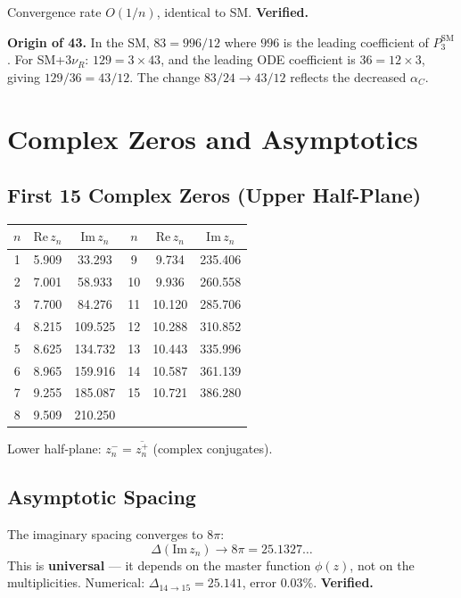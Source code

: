 \documentclass[11pt,a4paper]{article}
\newcommand{\proven}[1]{\textcolor{verified}{\textbf{#1}}}
\begin{document}
Convergence rate $O(1/n)$, identical to SM. \proven{Verified.}

\medskip\noindent
\textbf{Origin of 43.}
In the SM, $83 = 996/12$ where $996$ is the leading coefficient of $P_3^{\mathrm{SM}}$.
For SM+$3\nu_R$: $129 = 3 \times 43$, and the leading ODE coefficient is $36 = 12 \times 3$,
giving $129/36 = 43/12$.
The change $83/24 \to 43/12$ reflects the decreased $\alpha_C$.


\section{Complex Zeros and Asymptotics}

\subsection{First 15 Complex Zeros (Upper Half-Plane)}

\begin{center}
\begin{tabular}{ccc|ccc}
\toprule
$n$ & $\mathrm{Re}\,z_n$ & $\mathrm{Im}\,z_n$ & $n$ & $\mathrm{Re}\,z_n$ & $\mathrm{Im}\,z_n$ \\
\midrule
1 & 5.909 & 33.293 & 9 & 9.734 & 235.406 \\
2 & 7.001 & 58.933 & 10 & 9.936 & 260.558 \\
3 & 7.700 & 84.276 & 11 & 10.120 & 285.706 \\
4 & 8.215 & 109.525 & 12 & 10.288 & 310.852 \\
5 & 8.625 & 134.732 & 13 & 10.443 & 335.996 \\
6 & 8.965 & 159.916 & 14 & 10.587 & 361.139 \\
7 & 9.255 & 185.087 & 15 & 10.721 & 386.280 \\
8 & 9.509 & 210.250 & & & \\
\bottomrule
\end{tabular}
\end{center}

Lower half-plane: $z_n^- = \overline{z_n^+}$ (complex conjugates).

\subsection{Asymptotic Spacing}

The imaginary spacing converges to $8\pi$:
\[
  \Delta(\mathrm{Im}\,z_n) \to 8\pi = 25.1327\ldots
\]
This is \textbf{universal} --- it depends on the master function $\phi(z)$,
not on the multiplicities.
Numerical: $\Delta_{14\to 15} = 25.141$, error $0.03\%$. \proven{Verified.}
\end{document}
